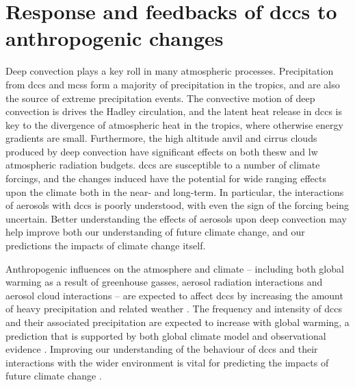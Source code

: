 \section{Response and feedbacks of \acrshort{dcc}s to anthropogenic changes}

Deep convection plays a key roll in many atmospheric processes.
Precipitation from \acrshort{dcc}s and \acrshort{mcs}s form a majority of precipitation in the tropics, and are also the source of extreme precipitation events.
The convective motion of deep convection is drives the Hadley circulation, and the latent heat release in \acrshort{dcc}s is key to the divergence of atmospheric heat in the tropics, where otherwise energy gradients are small.
Furthermore, the high altitude anvil and cirrus clouds produced by deep convection have significant effects on both the\acrshort{sw}  and \acrshort{lw} atmospheric radiation budgets.
\acrshort{dcc}s are susceptible to a number of climate forcings, and the changes induced have the potential for wide ranging effects upon the climate both in the near- and long-term.
In particular, the interactions of aerosols with \acrshort{dcc}s is poorly understood, with even the sign of the forcing being uncertain. Better understanding the effects of aerosols upon deep convection may help improve both our understanding of future climate change, and our predictions the impacts of climate change itself.


Anthropogenic influences on the atmosphere and climate -- including both global warming as a result of greenhouse gasses, aerosol radiation interactions and aerosol cloud interactions -- are expected to affect \acrshort{dcc}s by increasing the amount of heavy precipitation and related weather \citep[e.g.][]{allen_constraints_2002, trenberth_changing_2003, held_robust_2006, khain2005aerosol, koren_smoke_2008, rosenfeld_flood_2008, fan_microphysical_2013, fan_review_2016}.
The frequency and intensity of \acrshort{dcc}s and their associated precipitation are expected to increase with global warming, a prediction that is supported by both global climate model \citep{allen_constraints_2002, trenberth_changing_2003, held_robust_2006, muller_energetic_2011, ogorman_energetic_2012, ogorman_precipitation_2015} and observational evidence \citep{tan_increases_2015, berg_strong_2013, aumann_increased_2018, houze_extreme_2019}.
Improving our understanding of the behaviour of \acrshort{dcc}s and their interactions with the wider environment is vital for predicting the impacts of future climate change \citep{westra_future_2014}.

